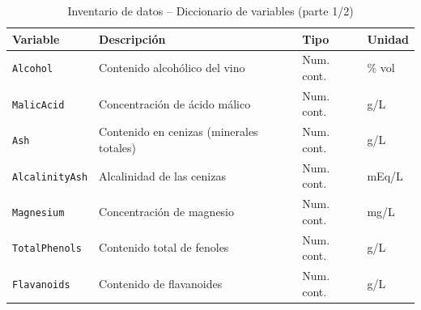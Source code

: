 \begin{table}[H]
    \centering
    \caption{Inventario de datos -- Diccionario de variables (parte 1/2)}
    \small
    \begin{tabular}{p{4cm} p{6.5cm} p{1.8cm} p{1.5cm}}
        \toprule
        \textbf{Variable} & \textbf{Descripci\'on} & \textbf{Tipo} & \textbf{Unidad} \\
        \midrule
        \texttt{Alcohol}
            & Contenido alcoh\'olico del vino
            & Num. cont. & \% vol \\[3pt]
        \texttt{MalicAcid}
            & Concentraci\'on de \'acido m\'alico
            & Num. cont. & g/L \\[3pt]
        \texttt{Ash}
            & Contenido en cenizas (minerales totales)
            & Num. cont. & g/L \\[3pt]
        \texttt{AlcalinityAsh}
            & Alcalinidad de las cenizas
            & Num. cont. & mEq/L \\[3pt]
        \texttt{Magnesium}
            & Concentraci\'on de magnesio
            & Num. cont. & mg/L \\[3pt]
        \texttt{TotalPhenols}
            & Contenido total de fenoles
            & Num. cont. & g/L \\[3pt]
        \texttt{Flavanoids}
            & Contenido de flavanoides
            & Num. cont. & g/L \\
        \bottomrule
    \end{tabular}
    \label{tab:diccionario1}
\end{table}

